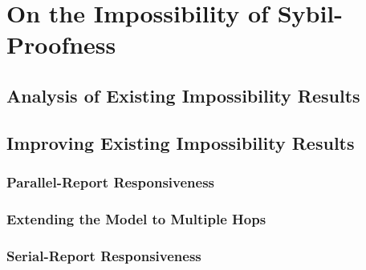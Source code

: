 \chapter{On the Impossibility of Sybil-Proofness}
\label{chap:On the Impossibility of Sybil-Proofness}



\section{Analysis of Existing Impossibility Results}
\label{Analysis of Existing Impossibility Results}



\section{Improving Existing Impossibility Results}
\label{Improving Existing Impossibility Results}


\subsection{Parallel-Report Responsiveness}
\label{subsec:Parallel-report Responsiveness}


\subsection{Extending the Model to Multiple Hops}
\label{subsec:Extending the Model to Multiple Hops}


\subsection{Serial-Report Responsiveness}
\label{subsec:Serial-Report Responsiveness}





